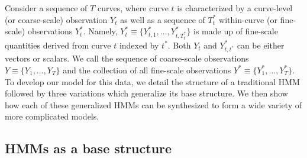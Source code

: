 
Consider a sequence of $T$ curves, where curve $t$ is characterized by a curve-level (or coarse-scale) observation $Y_t$ as well as a sequence of $T^*_t$ within-curve (or fine-scale) observations $Y^*_{t}$. Namely, $Y^*_{t} \equiv \big\{Y^*_{t,1},\ldots,Y^*_{t,T^*_t}\big\}$ is made up of fine-scale quantities derived from curve $t$ indexed by $t^*$. Both $Y_t$ and $Y^*_{t,t^*}$ can be either vectors or scalars. We call the sequence of coarse-scale observations $Y \equiv \big\{Y_1, \ldots, Y_T\big\}$ and the collection of all fine-scale observations $Y^* \equiv \big\{Y^*_1,\ldots,Y^*_T \big\}$. To develop our model for this data, we detail the structure of a traditional HMM followed by three variations which generalize its base structure. We then show how each of these generalized HMMs can be synthesized to form a wide variety of more complicated models.


\subsection{HMMs as a base structure}
\label{subsec:HMM}

